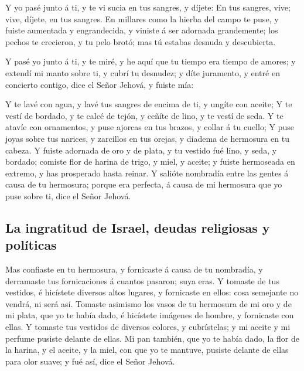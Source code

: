  Y yo pasé junto á ti, y te vi sucia en tus sangres, y
díjete: En tus sangres, vive; vive, díjete, en tus sangres. 
En millares como la hierba del campo te puse, y fuiste aumentada y
engrandecida, y viniste á ser adornada grandemente; los pechos te
crecieron, y tu pelo brotó; mas tú estabas desnuda y descubierta.

 Y pasé yo junto á ti, y te miré, y he aquí que tu tiempo
era tiempo de amores; y extendí mi manto sobre ti, y cubrí tu desnudez;
y díte juramento, y entré en concierto contigo, dice el Señor Jehová, y
fuiste mía:

 Y te lavé con agua, y lavé tus sangres de encima de ti, y
ungíte con aceite;  Y te vestí de bordado, y te calcé de
tejón, y ceñíte de lino, y te vestí de seda.  Y te atavíe
con ornamentos, y puse ajorcas en tus brazos, y collar á tu cuello;
 Y puse joyas sobre tus narices, y zarcillos en tus orejas,
y diadema de hermosura en tu cabeza.  Y fuiste adornada de
oro y de plata, y tu vestido fué lino, y seda, y bordado; comiste flor
de harina de trigo, y miel, y aceite; y fuiste hermoseada en extremo, y
has prosperado hasta reinar.  Y salióte nombradía entre las
gentes á causa de tu hermosura; porque era perfecta, á causa de mi
hermosura que yo puse sobre ti, dice el Señor Jehová.

\hypertarget{la-ingratitud-de-israel-deudas-religiosas-y-poluxedticas}{%
\subsection{La ingratitud de Israel, deudas religiosas y
políticas}\label{la-ingratitud-de-israel-deudas-religiosas-y-poluxedticas}}

 Mas confiaste en tu hermosura, y fornicaste á causa de tu
nombradía, y derramaste tus fornicaciones á cuantos pasaron; suya eras.
 Y tomaste de tus vestidos, é hicístete diversos altos
lugares, y fornicaste en ellos: cosa semejante no vendrá, ni será así.
 Tomaste asimismo los vasos de tu hermosura de mi oro y de
mi plata, que yo te había dado, é hicístete imágenes de hombre, y
fornicaste con ellas.  Y tomaste tus vestidos de diversos
colores, y cubrístelas; y mi aceite y mi perfume pusiste delante de
ellas.  Mi pan también, que yo te había dado, la flor de la
harina, y el aceite, y la miel, con que yo te mantuve, pusiste delante
de ellas para olor suave; y fué así, dice el Señor Jehová.

